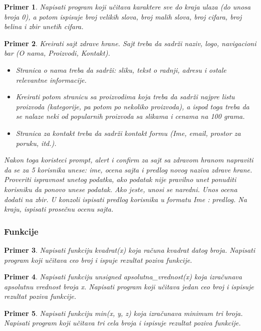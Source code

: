 \documentclass[a4paper]{article}
\newtheorem{primer}{Primer}[section]
\begin{document}
\begin{primer}
Napisati program koji učitava karaktere sve do kraja ulaza (do unosa broja 0), a potom ispisuje broj velikih slova, broj malih slova, broj cifara, broj belina i zbir unetih cifara. 
\end{primer}

\begin{primer}
Kreirati sajt zdrave hrane. Sajt treba da sadrži naziv, logo, navigacioni bar (O nama, Proizvodi, Kontakt). 
\begin{itemize}
    \item Stranica o nama treba da sadrži: sliku, tekst o radnji, adresu i ostale relevantne informacije. 
    \item Kreirati potom stranicu sa proizvodima koja treba da sadrži najpre listu proizvoda (kategorije, pa potom po nekoliko proizvoda), a ispod toga treba da se nalaze neki od popularnih proizvoda sa slikama i cenama na 100 grama. 
    \item Stranica za kontakt treba da sadrži kontakt formu (Ime, email, prostor za poruku, itd.).  
\end{itemize}

Nakon toga koristeci prompt, alert i confirm za sajt sa zdravom hranom napraviti da se za 5 korisnika unese: ime, ocena sajta i predlog novog naziva zdrave hrane. Proveriti ispravnost unetog podatka, ako podatak nije pravilno unet ponuditi korisniku da ponovo unese podatak. Ako jeste, unosi se naredni. Unos ocena dodati na zbir. U konzoli ispisati predlog korisnika u formatu Ime : predlog. Na kraju, ispisati prosečnu ocenu sajta.
\end{primer}

\subsubsection{Funkcije}

\begin{primer}
Napisati funkciju kvadrat(x) koja računa kvadrat
datog broja. Napisati program koji učitava ceo broj i ispuje rezultat poziva
funkcije.
\end{primer}

\begin{primer}
Napisati funkciju unsigned apsolutna\_vrednost(x) koja izračunava apsolutnu vrednost broja x. Napisati program koji učitava jedan ceo broj i ispisuje rezultat poziva funkcije.
\end{primer}

\begin{primer}
Napisati funkciju min(x, y, z) koja izračunava minimum tri broja. Napisati program koji učitava tri cela broja i ispisuje rezultat poziva funkcije.
\end{primer}
\end{document}
